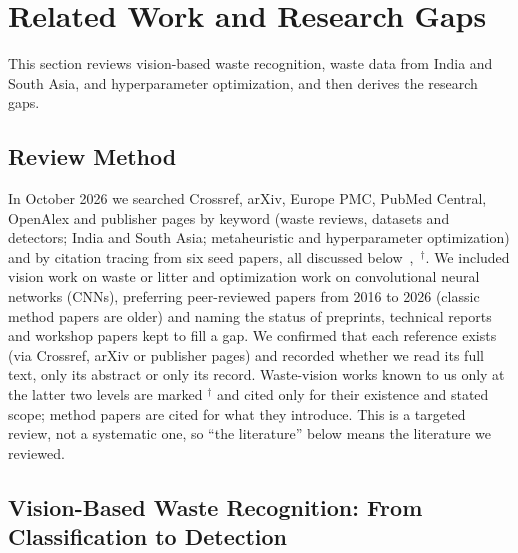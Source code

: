 \section{Related Work and Research Gaps}
\label{sec:related}

This section reviews vision-based waste recognition, waste data from India and South Asia, and hyperparameter optimization, and then derives the research gaps.

\subsection{Review Method}
\label{subsec:review-method}

In October 2026 we searched Crossref, arXiv, Europe PMC, PubMed Central, OpenAlex and publisher pages by keyword (waste reviews, datasets and detectors; India and South Asia; metaheuristic and hyperparameter optimization) and by citation tracing from six seed papers, all discussed below~\cite{majchrowska2022deep,yang2016classification,kaya2023classification,sayed2024intelligent,aguerchi2024cnn},~\cite{alshammari2025smart}$^{\dagger}$. We included vision work on waste or litter and optimization work on convolutional neural networks (CNNs), preferring peer-reviewed papers from 2016 to 2026 (classic method papers are older) and naming the status of preprints, technical reports and workshop papers kept to fill a gap. We confirmed that each reference exists (via Crossref, arXiv or publisher pages) and recorded whether we read its full text, only its abstract or only its record. Waste-vision works known to us only at the latter two levels are marked $^{\dagger}$ and cited only for their existence and stated scope; method papers are cited for what they introduce. This is a targeted review, not a systematic one, so ``the literature'' below means the literature we reviewed.

\subsection{Vision-Based Waste Recognition: From Classification to Detection}
\label{subsec:rw-waste}

